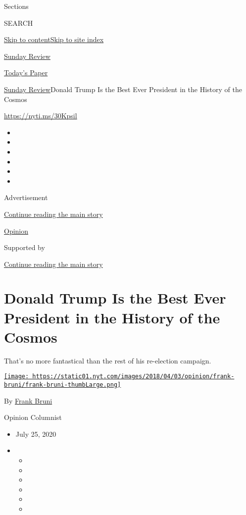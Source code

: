 Sections

SEARCH

\protect\hyperlink{site-content}{Skip to
content}\protect\hyperlink{site-index}{Skip to site index}

\href{https://www.nytimes.com/section/opinion/sunday}{Sunday Review}

\href{https://myaccount.nytimes.com/auth/login?response_type=cookie\&client_id=vi}{}

\href{https://www.nytimes.com/section/todayspaper}{Today's Paper}

\href{/section/opinion/sunday}{Sunday Review}\textbar{}Donald Trump Is
the Best Ever President in the History of the Cosmos

\href{https://nyti.ms/30Kpsil}{https://nyti.ms/30Kpsil}

\begin{itemize}
\item
\item
\item
\item
\item
\item
\end{itemize}

Advertisement

\protect\hyperlink{after-top}{Continue reading the main story}

\href{/section/opinion}{Opinion}

Supported by

\protect\hyperlink{after-sponsor}{Continue reading the main story}

\hypertarget{donald-trump-is-the-best-ever-president-in-the-history-of-the-cosmos}{%
\section{Donald Trump Is the Best Ever President in the History of the
Cosmos}\label{donald-trump-is-the-best-ever-president-in-the-history-of-the-cosmos}}

That's no more fantastical than the rest of his re-election campaign.

\href{https://www.nytimes.com/by/frank-bruni}{\texttt{[image: https://static01.nyt.com/images/2018/04/03/opinion/frank-bruni/frank-bruni-thumbLarge.png]}}

By \href{https://www.nytimes.com/by/frank-bruni}{Frank Bruni}

Opinion Columnist

\begin{itemize}
\item
  July 25, 2020
\item
  \begin{itemize}
  \item
  \item
  \item
  \item
  \item
  \item
  \end{itemize}
\end{itemize}

